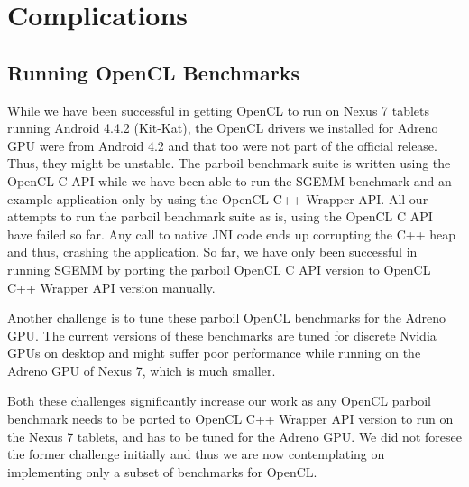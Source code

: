 \section*{Complications}
\subsection*{Running OpenCL Benchmarks}


While we have been successful in getting OpenCL to run on Nexus 7 tablets
running Android 4.4.2 (Kit-Kat), the OpenCL drivers we installed for Adreno
GPU were from
Android 4.2 and that too were not part of the official release. Thus, they might
be unstable. The parboil benchmark suite is written using the OpenCL C API while
we have been able to run the SGEMM benchmark and an example application only by using
the OpenCL C++ Wrapper API. All our attempts to run the parboil benchmark suite as
is, using the OpenCL C API have failed so far. Any call to native JNI code
ends up corrupting the C++ heap and thus, crashing the application. So far, we
have only been successful in running SGEMM by porting the parboil OpenCL C
API version to OpenCL C++ Wrapper API version manually.

Another challenge is to tune these parboil OpenCL benchmarks for the Adreno GPU.
The current versions of these benchmarks are tuned for discrete Nvidia GPUs on desktop and might
suffer poor performance while running on the Adreno GPU of Nexus 7, which is much
smaller.

Both these challenges significantly
increase our work as any OpenCL parboil benchmark needs to be ported to OpenCL
C++ Wrapper API version to run on the Nexus 7 tablets, and has to be tuned for
the Adreno GPU. We did not foresee the former
challenge initially and thus we are now contemplating on implementing only a
subset of benchmarks for OpenCL.
